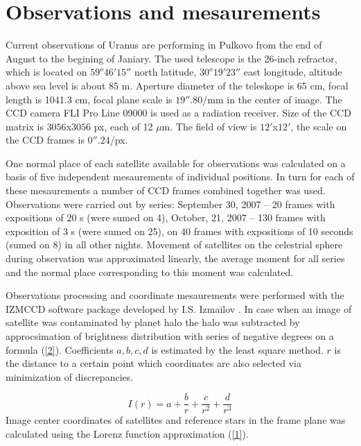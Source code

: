 \documentclass[]{article}
\begin{document}
\section{Observations and mesaurements}
Current observations of Uranus are performing in Pulkovo from the end of August to the begining of Janiary. The used telescope is the 26-inch refractor, which is located on $59^o46' 15''$ north latitude, $30^o19'23''$ east longitude, altitude above sea level is about 85 m.  Aperture diameter of the teleskope is 65 cm, focal length is 1041.3 cm, focal plane scale is $19''.80$/mm in the center of image. The CCD camera FLI Pro Line 09000  is used as a radiation receiver. Size of the CCD matrix is $3056$x$3056$ px, each of 12 $\mu$m.  The field of view is $12'$x$12'$, the scale on the CCD frames is $0''.24$/px.\par
One normal place of each satellite available for observations was calculated on a basis of five independent mesaurements of individual positions.  In turn for each of these mesaurements a number of CCD frames combined together was used. Observations were carried out by series: September 30, 2007 -- 20 frames with expositions of 20 s (were sumed on 4), October, 21, 2007 -- 130 frames with exposition of 3 s (were sumed on 25), on 40 frames with expositions of 10 seconds (sumed on 8) in all other nights. Movement of satellites on the celestrial sphere during observation was approximated linearly, the average moment for all series and the normal place corresponding to this moment was calculated.\par
Observations processing and coordinate mesaurements were performed with the IZMCCD software package developed by I.S. Izmailov \cite{3,4}. In case when an image of satellite was contaminated by planet halo the halo was subtracted by approcsimation of brightness distribution with series of negative degrees on a formula (\ref{2}). Coefficients $a, b, c, d$ is estimated by the least square method. $r$ is the distance to a certain point which coordinates are also selected via minimization of discrepancies.\par
\begin{equation}
\label{2}
I(r) = a + \frac{b}{r} + \frac{c}{r^2} + \frac{d}{r^3}
\end{equation}
Image center coordinates of satellites and reference stars in the frame plane was calculated using the Lorenz function approximation (\ref{1}).
\end{document}
